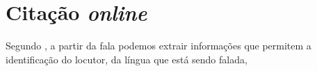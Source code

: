 \section{Citação \textit{online}}

Segundo , a partir da fala podemos extrair informações que permitem a identificação do locutor, da língua que está sendo falada,